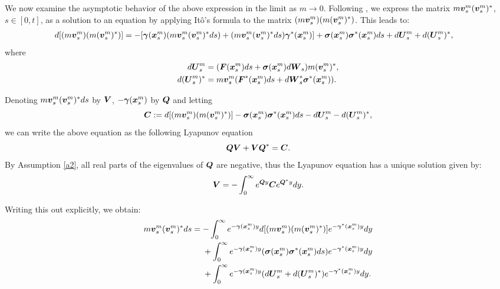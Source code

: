 

We now examine the asymptotic behavior of the above expression in the limit as $m \to 0$.
Following \cite{hottovy2015smoluchowski}, we express the matrix $m \boldsymbol{v}^m_{s} (\boldsymbol{v}^m_{s})^{*}$, $s \in [0,t]$, as a solution to an equation by applying It\^o's formula to the matrix $(m \boldsymbol{v}^m_{s})(m (\boldsymbol{v}^m_{s})^{*})$. This leads to:
\begin{align}
d[(m \boldsymbol{v}^m_{s})(m (\boldsymbol{v}^m_{s})^{*})] &= -[\boldsymbol{\gamma}(\boldsymbol{x}^m_{s}) (m \boldsymbol{v}^m_{s} (\boldsymbol{v}^m_{s})^{*} ds) + (m \boldsymbol{v}^m_{s} (\boldsymbol{v}^m_{s})^{*} ds) \boldsymbol{\gamma}^{*}(\boldsymbol{x}^m_{s})] + \boldsymbol{\sigma}(\boldsymbol{x}^m_{s}) \boldsymbol{\sigma}^{*}(\boldsymbol{x}^m_{s}) ds + d\boldsymbol{U}^m_{s} + d(\boldsymbol{U}^m_s)^{*},
\end{align}
where 
\begin{align}
d\boldsymbol{U}^m_{s} &= (\boldsymbol{F}(\boldsymbol{x}^m_{s}) ds + \boldsymbol{\sigma}(\boldsymbol{x}^m_{s}) d\boldsymbol{W}_{s}) m (\boldsymbol{v}^m_{s})^{*}, \\ 
d(\boldsymbol{U}^m_s)^{*} &= m \boldsymbol{v}^m_{s}(\boldsymbol{F}^{*}(\boldsymbol{x}^m_{s}) ds + d\boldsymbol{W}_{s}^{*} \boldsymbol{\sigma}^{*}(\boldsymbol{x}^m_{s})).
\end{align}

Denoting $m \boldsymbol{v}^m_{s} (\boldsymbol{v}^m_{s})^{*} ds$ by $\boldsymbol{V}$, $-\boldsymbol{\gamma}(\boldsymbol{x}^m_{s})$ by $\boldsymbol{Q}$ and letting \begin{equation}\boldsymbol{C} := d[(m \boldsymbol{v}^m_{s})(m (\boldsymbol{v}^m_{s})^{*})] - \boldsymbol{\sigma}(\boldsymbol{x}^m_{s}) \boldsymbol{\sigma}^{*}(\boldsymbol{x}^m_{s}) ds - d\boldsymbol{U}^m_{s} - d(\boldsymbol{U}^m_{s})^{*}, \end{equation} we can write the above equation as the following Lyapunov equation
\begin{equation}\boldsymbol{Q} \boldsymbol{V} + \boldsymbol{V} \boldsymbol{Q}^{*} = \boldsymbol{C}. \end{equation}
By Assumption \ref{a2}, all  real parts of the eigenvalues of $\boldsymbol{Q}$ are negative, thus the Lyapunov equation has a unique solution given by: 
\begin{equation}\boldsymbol{V} = - \int_{0}^{\infty} e^{\boldsymbol{Q} y} \boldsymbol{C} e^{\boldsymbol{Q}^{*}y} dy. \end{equation}

Writing this out explicitly, we obtain:
\begin{align}
m \boldsymbol{v}^m_{s} (\boldsymbol{v}^m_{s})^{*} ds &= - \int_{0}^{\infty} e^{-\boldsymbol{\gamma}(\boldsymbol{x}^m_{s}) y} d[(m \boldsymbol{v}^m_{s})(m (\boldsymbol{v}^m_{s})
^{*})]  e^{-\boldsymbol{\gamma}^{*}(\boldsymbol{x}^m_{s}) y} dy  \nonumber \\ 
&\ \ \ \ + \int_{0}^{\infty} e^{-\boldsymbol{\gamma}(\boldsymbol{x}^m_{s}) y} (\boldsymbol{\sigma}(\boldsymbol{x}^m_{s}) \boldsymbol{\sigma}^{*}(\boldsymbol{x}^m_{s}) ds) e^{-\boldsymbol{\gamma}^{*}(\boldsymbol{x}^m_{s}) y} dy  \nonumber \\
&\ \ \ \ + \int_{0}^{\infty} e^{-\boldsymbol{\gamma}(\boldsymbol{x}^m_{s}) y} (d\boldsymbol{U}^m_{s}+ d(\boldsymbol{U}^m_{s})^{*})   e^{-\boldsymbol{\gamma}^{*}(\boldsymbol{x}^m_{s}) y} dy.\label{estb}
\end{align}

